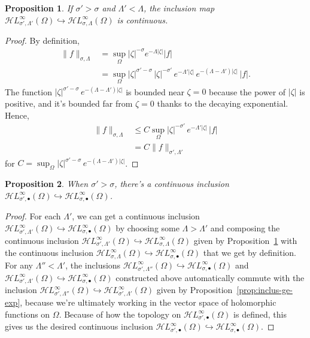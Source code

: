 \documentclass{article}
\theoremstyle{definition}
\theoremstyle{plain}
\newtheorem{prop}{Proposition}
\newcommand{\singexp}[2]{\mathcal{H}L^\infty_{#1, #2}}
\newcommand{\singexpalg}[1]{\singexp{#1}{\bullet}}
\newcommand{\domain}{\Omega}
\begin{document}
\begin{prop}\label{prop:inclus-lt-pow-gt-exp}
If $\sigma'>\sigma$ and $\Lambda'<\Lambda$, the inclusion map $\singexp{\sigma'}{\Lambda'}(\Omega)\hookrightarrow \singexp{\sigma}{\Lambda}(\Omega)$ is continuous.
\end{prop}
\begin{proof}
By definition,
\begin{align*}
\|f\|_{\sigma,\Lambda}&=\sup_{\Omega} |\zeta|^{-\sigma}  e^{-\Lambda |\zeta|} |f|\\
&= \sup_{\Omega} |\zeta|^{\sigma'-\sigma}\,|\zeta|^{-\sigma'}\,e^{-\Lambda'|\zeta|}\,  e^{-(\Lambda-\Lambda') |\zeta|} \, |f|.
\end{align*}
The function $|\zeta|^{\sigma'-\sigma}\,  e^{-(\Lambda-\Lambda') |\zeta|}$ is bounded near $\zeta = 0$ because the power of $|\zeta|$ is positive, and it's bounded far from $\zeta = 0$ thanks to the decaying exponential. Hence,
\begin{align*}
\|f\|_{\sigma,\Lambda}&\leq C\sup_\Omega  |\zeta|^{-\sigma'}\, e^{-\Lambda'|\zeta|} \, |f|\\
&=C \|f\|_{\sigma',\Lambda'}
\end{align*}
for $C = \sup_{\Omega}  |\zeta|^{\sigma'-\sigma}\,  e^{-(\Lambda-\Lambda') |\zeta|}$.
\end{proof}
\begin{prop}\label{prop:inclus-lt-pow-alg}
When $\sigma' > \sigma$, there's a continuous inclusion $\singexpalg{\sigma'}(\domain)\hookrightarrow \singexpalg{\sigma}(\domain)$.
\end{prop}
\begin{proof}
For each $\Lambda'$, we can get a continuous inclusion $\singexp{\sigma'}{\Lambda'}(\Omega) \hookrightarrow \singexpalg{\sigma}(\Omega)$ by choosing some $\Lambda > \Lambda'$ and composing the continuous inclusion $\singexp{\sigma'}{\Lambda'}(\Omega) \hookrightarrow \singexp{\sigma}{\Lambda}(\Omega)$ given by Proposition~\ref{prop:inclus-lt-pow-gt-exp} with the continuous inclusion $\singexp{\sigma}{\Lambda}(\Omega) \hookrightarrow \singexpalg{\sigma}(\Omega)$ that we get by definition. For any $\Lambda'' < \Lambda'$, the inclusions $\singexp{\sigma'}{\Lambda''}(\Omega) \hookrightarrow \singexpalg{\sigma}(\Omega)$ and $\singexp{\sigma'}{\Lambda'}(\Omega) \hookrightarrow \singexpalg{\sigma}(\Omega)$ constructed above automatically commute with the inclusion $\singexp{\sigma'}{\Lambda''}(\Omega) \hookrightarrow \singexp{\sigma'}{\Lambda'}(\Omega)$ given by Proposition~\ref{prop:inclus-ge-exp}, because we're ultimately working in the vector space of holomorphic functions on $\Omega$. Because of how the topology on $\singexpalg{\sigma'}(\Omega)$ is defined, this gives us the desired continuous inclusion $\singexpalg{\sigma'}(\Omega)\hookrightarrow \singexpalg{\sigma}(\Omega)$.
\end{proof}
\end{document}
